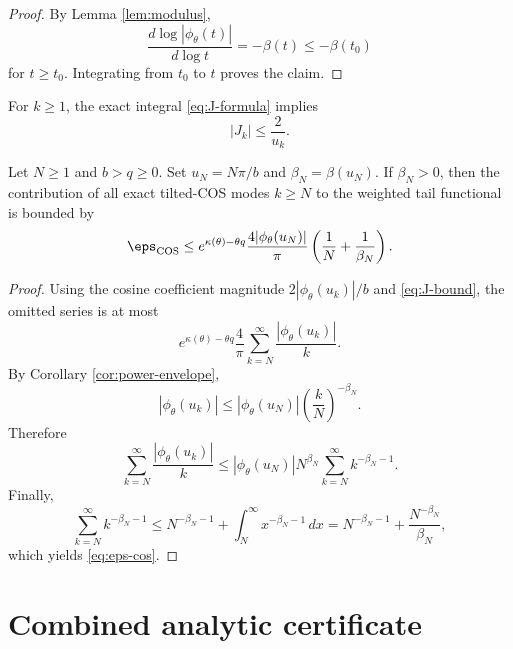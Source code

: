 \begin{proof}
By Lemma \ref{lem:modulus},
\[
\frac{d\log|\phi_{\theta}(t)|}{d\log t}=-\beta(t)\le-\beta(t_0)
\]
for $t\ge t_0$. Integrating from $t_0$ to $t$ proves the claim.
\end{proof}

For $k\ge1$, the exact integral \eqref{eq:J-formula} implies
\begin{equation}
|J_k|
\le \frac{2}{u_k}.
\label{eq:J-bound}
\end{equation}

\begin{theorem}
\label{thm:cos-tail}
Let $N\ge1$ and $b>q\ge0$. Set $u_N=N\pi/b$ and
$\beta_N=\beta(u_N)$. If $\beta_N>0$, then the contribution of all exact tilted-COS modes $k\ge N$ to the weighted tail functional is bounded by
\begin{equation}
\eps_{\mathrm{COS}}
\le
 e^{\kappa(\theta)-\theta q}
\frac{4|\phi_{\theta}(u_N)|}{\pi}
\left(\frac1N+\frac1{\beta_N}\right).
\label{eq:eps-cos}
\end{equation}
\end{theorem}

\begin{proof}
Using the cosine coefficient magnitude $2|\phi_{\theta}(u_k)|/b$ and \eqref{eq:J-bound}, the omitted series is at most
\[
e^{\kappa(\theta)-\theta q}
\frac{4}{\pi}
\sum_{k=N}^{\infty}\frac{|\phi_{\theta}(u_k)|}{k}.
\]
By Corollary \ref{cor:power-envelope},
\[
|\phi_{\theta}(u_k)|
\le
|\phi_{\theta}(u_N)|\left(\frac{k}{N}\right)^{-\beta_N}.
\]
Therefore
\[
\sum_{k=N}^{\infty}\frac{|\phi_{\theta}(u_k)|}{k}
\le
|\phi_{\theta}(u_N)|N^{\beta_N}
\sum_{k=N}^{\infty}k^{-\beta_N-1}.
\]
Finally,
\[
\sum_{k=N}^{\infty}k^{-\beta_N-1}
\le N^{-\beta_N-1}+\int_N^{\infty}x^{-\beta_N-1}\,dx
=N^{-\beta_N-1}+\frac{N^{-\beta_N}}{\beta_N},
\]
which yields \eqref{eq:eps-cos}.
\end{proof}

\section{Combined analytic certificate}

